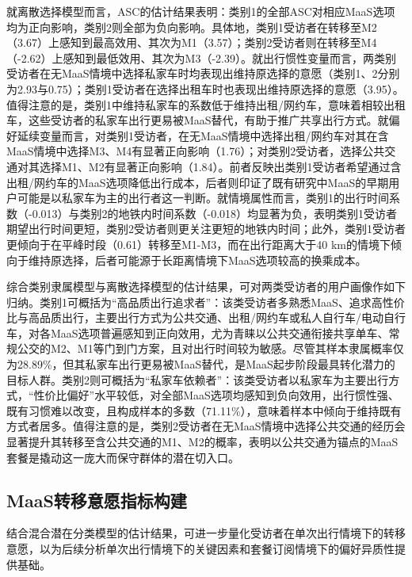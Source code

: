 就离散选择模型而言，ASC的估计结果表明：类别1的全部ASC对相应MaaS选项均为正向影响，类别2则全部为负向影响。具体地，类别1受访者在转移至M2（3.67）上感知到最高效用、其次为M1（3.57）；类别2受访者则在转移至M4（-2.62）上感知到最低效用、其次为M3（-2.39）。就出行惯性变量而言，两类别受访者在无MaaS情境中选择私家车时均表现出维持原选择的意愿（类别1、2分别为2.93与0.75）；类别1受访者在选择出租车时也表现出维持原选择的意愿（3.95）。值得注意的是，类别1中维持私家车的系数低于维持出租/网约车，意味着相较出租车，这些受访者的私家车出行更易被MaaS替代，有助于推广共享出行方式。就偏好延续变量而言，对类别1受访者，在无MaaS情境中选择出租/网约车对其在含MaaS情境中选择M3、M4有显著正向影响（1.76）；对类别2受访者，选择公共交通对其选择M1、M2有显著正向影响（1.84）。前者反映出类别1受访者希望通过含出租/网约车的MaaS选项降低出行成本，后者则印证了既有研究中MaaS的早期用户可能是以私家车为主的出行者这一判断\citep{hoPublicPreferencesMobility2020}。就情境属性而言，类别1的出行时间系数（-0.013）与类别2的地铁内时间系数（-0.018）均显著为负，表明类别1受访者期望出行时间更短，类别2受访者则更关注更短的地铁内时间；此外，类别1受访者更倾向于在平峰时段（0.61）转移至M1-M3，而在出行距离大于40 km的情境下倾向于维持原选择，后者可能源于长距离情境下MaaS选项较高的换乘成本。

综合类别隶属模型与离散选择模型的估计结果，可对两类受访者的用户画像作如下归纳。类别1可概括为``高品质出行追求者''：该类受访者多熟悉MaaS、追求高性价比与高品质出行，主要出行方式为公共交通、出租/网约车或私人自行车/电动自行车，对各MaaS选项普遍感知到正向效用，尤为青睐以公共交通衔接共享单车、常规公交的M2、M1等门到门方案，且对出行时间较为敏感。尽管其样本隶属概率仅为28.89\%，但其私家车出行更易被MaaS替代，是MaaS起步阶段最具转化潜力的目标人群。类别2则可概括为``私家车依赖者''：该类受访者以私家车为主要出行方式，``性价比偏好''水平较低，对全部MaaS选项均感知到负向效用，出行惯性强、既有习惯难以改变，且构成样本的多数（71.11\%），意味着样本中倾向于维持既有方式者居多。值得注意的是，类别2受访者在无MaaS情境中选择公共交通的经历会显著提升其转移至含公共交通的M1、M2的概率，表明以公共交通为锚点的MaaS套餐是撬动这一庞大而保守群体的潜在切入口。

\subsection{MaaS转移意愿指标构建}\label{subsec.staged.shift.index}

结合混合潜在分类模型的估计结果，可进一步量化受访者在单次出行情境下的转移意愿，以为后续分析单次出行情境下的关键因素和套餐订阅情境下的偏好异质性提供基础。

